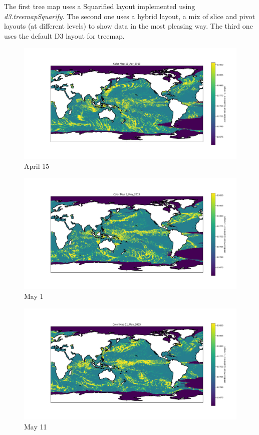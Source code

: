 \documentclass[conference]{IEEEtran}
\begin{document}
\begin{enumerate}
The first tree map uses a Squarified layout implemented using \textit{d3.treemapSquarify}. The second one uses a hybrid layout, a mix of slice and pivot layouts (at different levels) to show data in the most pleasing way. The third one uses the default D3 layout for treemap.
\\

     

    \begin{figure}
        \centering
        \includegraphics[width=1\linewidth]{Figure_0.png}
        \caption{April 15}
        \label{fig:enter-label}
    \end{figure}
    
    
    \begin{figure}
        \centering
        \includegraphics[width=1\linewidth]{Figure_1.png}
        \caption{May 1}
        \label{fig:enter-label}
    \end{figure}
    
    
  
     \begin{figure}
         \centering
         \includegraphics[width=1\linewidth]{Figure_2.png}
         \caption{May 11}
         \label{fig:enter-label}
     \end{figure}
    

\end{enumerate}
\end{document}
